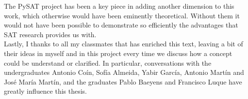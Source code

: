 \documentclass[
12pt, %
english, %
singlespacing, %
headsepline, %
]{MastersDoctoralThesis} %
\theoremstyle{definition}
\begin{document}
The PySAT project has been a key piece in adding another dimension to this work, which otherwise would have been eminently theoretical. Without them it would not have been possible to demonstrate so efficiently the advantages that SAT research provides us with. \\

Lastly, I thanks to all my classmates that has enriched this text, leaving a bit of their ideas in myself and in this project every time we discuss how a concept could be understand or clarified. In particular, conversations with the undergraduates Antonio Coín, Sofía Almeida, Yabir García, Antonio Martín and José María Martín,  and the graduates Pablo Baeyens and Francisco Luque have greatly influence this thesis.\\


%
%


\medskip


\printbibliography
\end{document}
